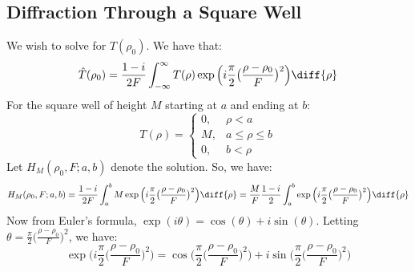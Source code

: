 \documentclass[crop=false,class=book,oneside]{standalone}
\begin{document}
        \subsection{Diffraction Through a Square Well}
            \label{Subsec:Cassini_Math_Diffraction_%
                   Through_a_Square_well}
            We wish to solve for $\hat{T}(\rho_{0})$. We have that:
            \begin{equation*}
                \hat{T}(\rho_{0})
                =\frac{1-i}{2F}
                    \int_{-\infty}^{\infty}T(\rho)
                    \exp\Big(i\frac{\pi}{2}
                        \big(\frac{\rho-\rho_{0}}{F}\big)^{2}\Big)
                    \diff{\rho}
            \end{equation*}
            For the square well of height $M$
            starting at $a$ and ending at $b$:
            \begin{equation*}
                T(\rho)=
                \begin{cases}
                    0,&\rho<a\\
                    M,&a\leq\rho\leq{b}\\
                    0,&b<\rho
                \end{cases}
            \end{equation*}
            Let $H_{M}(\rho_0,F;a,b)$ denote the solution.
            So, we have:
            \begin{equation*}
                H_{M}(\rho_0,F;a,b)
                =\frac{1-i}{2F}
                    \int_{a}^{b}M
                    \exp\Big(i\frac{\pi}{2}
                        \big(\frac{\rho-\rho_{0}}{F}\big)^{2}\Big)
                    \diff{\rho}
                =\frac{M}{F}\frac{1-i}{2}
                    \int_{a}^{b}
                    \exp\Big(i\frac{\pi}{2}
                        \big(\frac{\rho-\rho_{0}}{F}\big)^{2}\Big)
                    \diff{\rho}
            \end{equation*}
            Now from Euler's formula,
            $\exp(i\theta)=\cos(\theta)+i\sin(\theta).$ Letting
            $\theta=\frac{\pi}{2}\big(\frac{\rho-\rho_0}{F}\big)^2$,
            we have:
            \begin{equation*}
                \exp\Big(
                    i\frac{\pi}{2}\big(\frac{\rho-\rho_{0}}{F}\big)^{2}
                    \Big)
                =\cos\Big(
                    \frac{\pi}{2}\big(\frac{\rho-\rho_{0}}{F}\big)^{2}
                \Big)+
                i\sin\Big(
                    \frac{\pi}{2}\big(\frac{\rho-\rho_{0}}{F}\big)^{2}
                \Big)
            \end{equation*}
\end{document}
